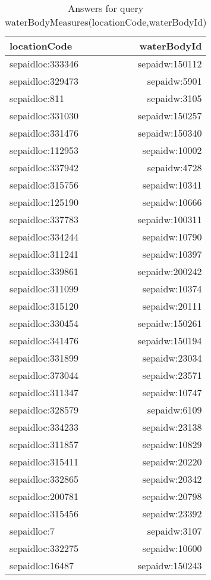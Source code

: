 \documentclass[a4paper,10pt]{article}
\begin{document}
\begin{table}
\caption{Answers for query waterBodyMeasures(locationCode,waterBodyId) }		
\begin{center}
\begin{tabular}{ l r}
\hline
locationCode & waterBodyId \\ \hline
sepaidloc:333346 & sepaidw:150112 \\
 sepaidloc:329473 & sepaidw:5901  \\ 
 sepaidloc:811    & sepaidw:3105  \\ 
 sepaidloc:331030 & sepaidw:150257 \\
 sepaidloc:331476 & sepaidw:150340 \\
 sepaidloc:112953 & sepaidw:10002  \\
 sepaidloc:337942 & sepaidw:4728   \\
 sepaidloc:315756 & sepaidw:10341  \\
 sepaidloc:125190 & sepaidw:10666  \\
 sepaidloc:337783 & sepaidw:100311 \\
 sepaidloc:334244 & sepaidw:10790 \\ 
 sepaidloc:311241 & sepaidw:10397  \\
 sepaidloc:339861 & sepaidw:200242 \\
  sepaidloc:311099 & sepaidw:10374  \\
 sepaidloc:315120 & sepaidw:20111  \\
 sepaidloc:330454 & sepaidw:150261 \\
 sepaidloc:341476 & sepaidw:150194 \\
 sepaidloc:331899 & sepaidw:23034  \\
 sepaidloc:373044 & sepaidw:23571  \\
 sepaidloc:311347 & sepaidw:10747  \\
 sepaidloc:328579 & sepaidw:6109   \\
 sepaidloc:334233 & sepaidw:23138  \\
 sepaidloc:311857 & sepaidw:10829  \\
 sepaidloc:315411 & sepaidw:20220  \\
 sepaidloc:332865 & sepaidw:20342  \\
 sepaidloc:200781 & sepaidw:20798  \\
sepaidloc:315456 & sepaidw:23392  \\
 sepaidloc:7	   & sepaidw:3107   \\
 sepaidloc:332275 & sepaidw:10600  \\
 sepaidloc:16487  & sepaidw:150243 \\

\end{tabular}
\end{center}
\end{table}
\end{document}
